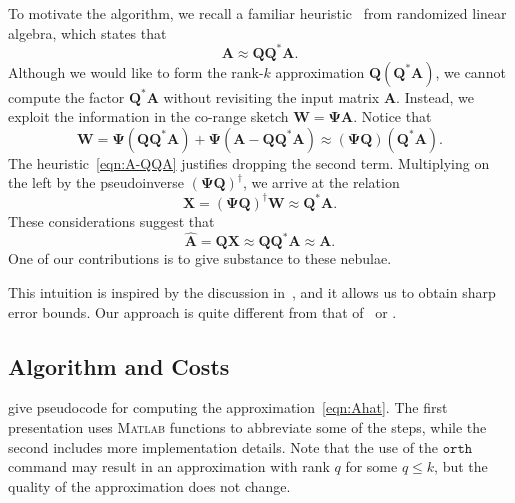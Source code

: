 \documentclass[final]{siamart1116}
\numberwithin{equation}{section}
\numberwithin{theorem}{section}
\numberwithin{figure}{section}
\newcommand{\mtx}[1]{\bm{#1}}
\begin{document}
To motivate the algorithm, we recall a familiar
heuristic~\cite[Sec.~1]{HMT11:Finding-Structure}
from randomized linear algebra, which states that
\begin{equation} \label{eqn:A-QQA}
\mtx{A} \approx \mtx{QQ}^* \mtx{A}.
\end{equation}
Although we would like to form the rank-$k$ approximation $\mtx{Q} (\mtx{Q}^* \mtx{A})$,
we cannot compute the factor $\mtx{Q}^* \mtx{A}$ without revisiting the input matrix $\mtx{A}$.
Instead, we exploit the information in the co-range sketch $\mtx{W} = \mtx{\Psi}\mtx{A}$.
Notice that
$$
\mtx{W} = \mtx{\Psi}(\mtx{Q} \mtx{Q}^*\mtx{A}) + \mtx{\Psi}(\mtx{A} - \mtx{QQ}^* \mtx{A})
	\approx (\mtx{\Psi} \mtx{Q})(\mtx{Q}^*\mtx{A}).
$$
The heuristic~\cref{eqn:A-QQA} justifies dropping the second term.
Multiplying on the left by the pseudoinverse $(\mtx{\Psi} \mtx{Q})^{\dagger}$,
we arrive at the relation
$$
\mtx{X} = (\mtx{\Psi} \mtx{Q})^{\dagger} \mtx{W} \approx \mtx{Q}^* \mtx{A}.
$$
These considerations suggest that
$$
\hat{\mtx{A}} = \mtx{QX} \approx \mtx{QQ}^*\mtx{A} \approx \mtx{A}.
$$
One of our contributions is to give substance to these nebulae.

\begin{remark}
This intuition is inspired by the discussion in~\cite[Sec.~5.5]{HMT11:Finding-Structure},
and it allows us to obtain sharp error bounds.
Our approach is quite different from that of~\cite[Thm.~4.7]{CW09:Numerical-Linear}
or \cite[Thm.~4.3]{Woo14:Sketching-Tool}. \end{remark}




\subsection{Algorithm and Costs}

give pseudocode for computing the approximation~\cref{eqn:Ahat}.
The first presentation uses \textsc{Matlab} functions to abbreviate some of the steps,
while the second includes more implementation details.
Note that the use of the $\texttt{orth}$ command may result in an approximation with
rank $q$ for some $q \leq k$, but the quality of the approximation does not change.
\end{document}
